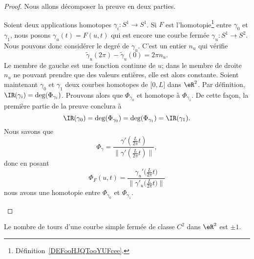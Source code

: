 \begin{proof}
	Nous allons décomposer la preuve en deux parties.
	\begin{subproof}
		Soient deux applications homotopes \( \gamma_i\colon S^1\to S^1\). Si \( F\) est l'homotopie\footnote{Définition~\ref{DEFooHJQTooYUFcee}.} entre \( \gamma_0\) et \( \gamma_1\), nous posons \( \gamma_u(t)=F(u,t)\) qui est encore une courbe fermée \( \gamma_u\colon S^1\to S^2\). Nous pouvons donc considérer le degré de \( \gamma_u\). C'est un entier \( n_u\) qui vérifie
		\begin{equation}
			\tilde \gamma_u(2\pi)-\tilde \gamma_u(0)=2\pi n_u.
		\end{equation}
		Le membre de gauche est une fonction continue de \( u\); dans le membre de droite \( n_u\) ne pouvant prendre que des valeurs entières, elle est alors constante.
		Soient maintenant \( \gamma_0\) et \( \gamma_1\) deux courbes homotopes de \( \mathopen[ 0 , L \mathclose]\) dans \( \eR^2\). Par définition, \( \IR(\gamma_i)=\deg(\Phi_{\gamma_i})\). Prouvons alors que \( \Phi_{\gamma_0}\) et homotope à \( \Phi_{\gamma_1}\). De cette façon, la première partie de la preuve conclura à
		\begin{equation}
			\IR(\gamma_0)=\deg(\Phi_{\gamma_0})=\deg(\Phi_{\gamma_1})=\IR(\gamma_1).
		\end{equation}
		Nous savons que
		\begin{equation}
			\Phi_{\gamma}=\frac{ \gamma'\left( \frac{ L }{ 2\pi }t \right) }{ \| \gamma'\left( \frac{ L }{ 2\pi }t \right) \| },
		\end{equation}
		donc en posant
		\begin{equation}
			\Phi_F(u,t)=\frac{ \gamma_u'\big( \frac{ L }{ 2\pi }t \big) }{ \| \gamma'_u\big( \frac{ L }{ 2\pi }t \big) \| }
		\end{equation}
		nous avons une homotopie entre \( \Phi_{\gamma_0}\) et \( \Phi_{\gamma_1}\).
	\end{subproof}
\end{proof}

\begin{theorem}      \label{THOooEQWOooBCRMMZ}
	Le nombre de tours d'une courbe simple fermée de classe \(  C^{2}\) dans \( \eR^2\) est \( \pm 1\).
\end{theorem}

